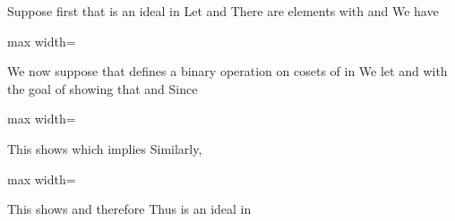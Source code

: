 \documentclass[11pt,oneside]{article}
\begin{document}
\BookNarrativetrue

\begin{BookBody}

 Suppose first that  is an ideal in  Let  and  There are elements  with  and  We have

\begin{center}\begin{adjustbox}{max width=\linewidth}\end{adjustbox}\end{center}

\noindent We now suppose that  defines a binary operation on cosets of  in  We let  and  with the goal of showing that  and  Since 

\begin{center}\begin{adjustbox}{max width=\linewidth}\end{adjustbox}\end{center}

\noindent This shows  which implies  Similarly,

\begin{center}\begin{adjustbox}{max width=\linewidth}\end{adjustbox}\end{center}

\noindent This shows  and therefore  Thus  is an ideal in  \BookEnd{\blacklozenge}


\end{BookBody}
\end{document}
